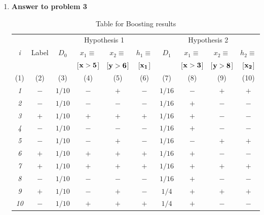 \begin{enumerate}
\begin{enumerate}
{\bf Finally}, $K_3 = 100(x_1z_1 + x_2z_2) = 10(x_1, x_2) 10(z_1, z_2)^T = \psi_3(\vec{x})^T\psi_3(\vec{z})$ is also a kernel.\\

Since, $K_1$, $K_2$ and $K_3$ are all valid kernels, so
$$K(\vec{x}, \vec{z}) = K_1 + K_2 + K_3 = \psi_1(\vec{x})^T\psi_1(\vec{z}) + \psi_2(\vec{x})^T\psi_2(\vec{z}) + \psi_3(\vec{x})^T\psi_3(\vec{z})$$
$$K(\vec{x}, \vec{z}) = [\psi_1(\vec{x}) \psi_2(\vec{x}) \psi_3(\vec{x})] [\psi_1(\vec{z}) \psi_2(\vec{z}) \psi_3(\vec{z})]^T$$
So, ${\bf K(\vec{x}, \vec{z})}$ is also valid kernels.\\
\end{enumerate}

\item {\bf Answer to problem 3}
    \begin{table}[H]
      {\centering
        \begin{tabular}{|c|c||c|c|c|c||c|c|c|c|}

          \hline
          & & \multicolumn{4}{c||}{Hypothesis 1}
	  & \multicolumn{4}{c|}{Hypothesis 2} \\
          \cline{3-10}
          {\em i} & Label & $D_0$ & $x_1 \equiv $ & $x_2 \equiv $ & $h_1\equiv$ & $D_1$ &  $x_1 \equiv $ & $x_2 \equiv $ & $h_2 \equiv $ \\
          & & & [$\bf x > 5$] & [$\bf y > 6$] & [$\bf x_1 $] & & [$\bf x > 3$] & [$\bf y > 8$] & [$\bf x_2$] \\

          \tiny{(1)} & \tiny{(2)} & \tiny{(3)} & \tiny{(4)} &  \tiny{(5)} & \tiny{(6)} & \tiny{(7)} & \tiny{(8)} & \tiny{(9)} & \tiny{(10)}\\
          \hline \hline
          {\em 1} & $-$ &$1/10$&$-$&$+$&$-$&$1/16$&$-$&$+$&$+$ \\
          \hline
          {\em 2} & $-$ &$1/10$&$-$&$-$&$-$&$1/16$&$+$&$-$&$-$ \\
          \hline
          {\em 3} & $+$ &$1/10$&$+$&$+$&$+$&$1/16$&$+$&$-$&$-$\\
          \hline
          {\em 4} & $-$ &$1/10$&$-$&$-$&$-$&$1/16$&$+$&$-$&$-$\\
          \hline
          {\em 5} & $-$ &$1/10$&$-$&$+$&$-$&$1/16$&$-$&$+$&$+$\\
          \hline
          {\em 6} & $+$ &$1/10$&$+$&$+$&$+$&$1/16$&$+$&$-$&$-$\\
          \hline
          {\em 7} & $+$ &$1/10$&$+$&$+$&$+$&$1/16$&$+$&$+$&$+$\\
          \hline
          {\em 8} & $-$ &$1/10$&$-$&$-$&$-$&$1/16$&$+$&$-$&$-$\\
          \hline
          {\em 9} & $+$ &$1/10$&$-$&$+$&$-$&$1/4$&$+$&$+$&$+$\\
          \hline
          {\em 10} & $-$ &$1/10$&$+$&$+$&$+$&$1/4$&$+$&$-$&$-$\\
          \hline
        \end{tabular}
        \caption{Table for Boosting results} \label{table:ltu}}
    \end{table}


\end{enumerate}
